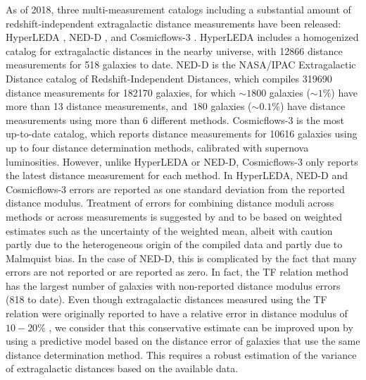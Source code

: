 \documentclass[a4paper,fleqn,usenatbib]{mnras}
\begin{document}
As of 2018, three multi-measurement catalogs including a substantial amount of redshift-independent extragalactic distance measurements have been released: HyperLEDA \citep{hyperleda}, NED-D \citep{ned07,ned}, and Cosmicflows-3 \citep{cosmicflows}. HyperLEDA includes a homogenized catalog for extragalactic distances in the nearby universe, with 12866 distance measurements for 518 galaxies to date. NED-D is the NASA/IPAC Extragalactic Distance catalog of Redshift-Independent Distances, which compiles 319690 distance measurements for 182170 galaxies, for which  $\sim1800$ galaxies ($\sim1$\%) have more than 13 distance measurements, and $~180$ galaxies ($\sim0.1$\%) have distance measurements using more than 6 different methods. Cosmicflows-3 is the most up-to-date catalog, which reports distance measurements for 10616 galaxies using up to four distance determination methods, calibrated with supernova luminosities. However, unlike HyperLEDA or NED-D, Cosmicflows-3 only reports the latest distance measurement for each method. In HyperLEDA, NED-D and Cosmicflows-3 errors are reported as one standard deviation from the reported distance modulus. Treatment of errors for combining distance moduli across methods or across measurements is suggested by \citet{ned07} and \citet{cosmicflows} to be based on weighted estimates such as the uncertainty of the weighted mean, albeit with caution partly due to the heterogeneous origin of the compiled data and partly due to Malmquist bias. In the case of NED-D, this is complicated by the fact that many errors are not reported or are reported as zero. In fact, the TF relation method has the largest number of galaxies with non-reported distance modulus errors (818 to date). Even though extragalactic distances measured using the TF relation were originally reported to have a relative error in distance modulus of $10-20$\% \citep{tforig}, we consider that this conservative estimate can be improved upon by using a predictive model based on the distance error of galaxies that use the same distance determination method. This requires a robust estimation of the variance of extragalactic distances based on the available data.\\
\end{document}
